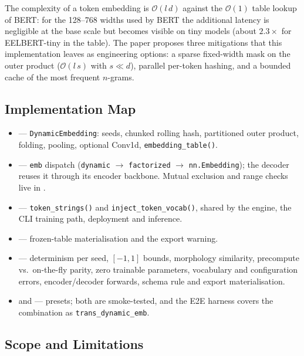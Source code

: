 The complexity of a token embedding is $\mathcal{O}(l\,d)$ against the $\mathcal{O}(1)$ table lookup of BERT: for the 128--768 widths used by BERT the additional latency is negligible at the base scale but becomes visible on tiny models (about $2.3\times$ for EELBERT-tiny in the table). The paper proposes three mitigations that this implementation leaves as engineering options: a sparse fixed-width mask on the outer product ($\mathcal{O}(l\,s)$ with $s\ll d$), parallel per-token hashing, and a bounded cache of the most frequent $n$-grams.

\subsection{Implementation Map}

\begin{itemize}[leftmargin=1.4em]
\item {} --- \texttt{DynamicEmbedding}: seeds, chunked rolling hash, partitioned outer product, folding, pooling, optional Conv1d, \texttt{embedding\_table()}.
\item {} --- \texttt{emb} dispatch (\texttt{dynamic} $\to$ \texttt{factorized} $\to$ \texttt{nn.Embedding}); the decoder reuses it through its encoder backbone. Mutual exclusion and range checks live in .
\item {} --- \texttt{token\_strings()} and \texttt{inject\_token\_vocab()}, shared by the engine, the CLI training path, deployment and inference.
\item {} --- frozen-table materialisation and the export warning.
\item {} --- determinism per seed, $[-1,1]$ bounds, morphology similarity, precompute vs.\ on-the-fly parity, zero trainable parameters, vocabulary and configuration errors, encoder/decoder forwards, schema rule and export materialisation.
\item {} and  --- presets; both are smoke-tested, and the E2E harness covers the combination as \texttt{trans\_dynamic\_emb}.
\end{itemize}

\subsection{Scope and Limitations}

